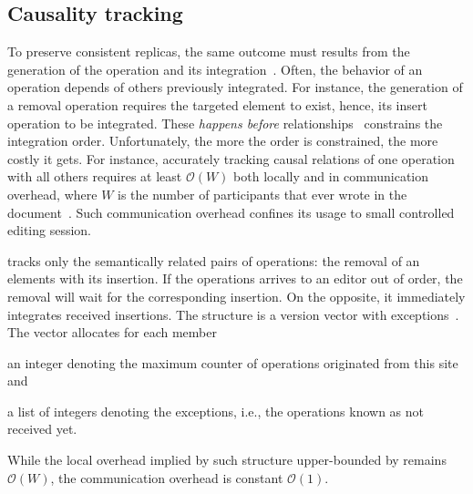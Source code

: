 

\subsection{Causality tracking}
\label{subsec:causality}

To preserve consistent replicas, the same outcome must results from the
generation of the operation and its integration~\cite{sun1998achieving}. Often,
the behavior of an operation depends of others previously integrated. For
instance, the generation of a removal operation requires the targeted element to
exist, hence, its insert operation to be integrated. These \emph{happens before}
relationships~\cite{lamport1978time} constrains the integration order.
Unfortunately, the more the order is constrained, the more costly it gets. For
instance, accurately tracking causal relations of one operation with all others
requires at least $\mathcal{O}(W)$ both locally and in communication overhead,
where $W$ is the number of participants that ever wrote in the
document~\cite{charronbost1991concerning}. Such communication overhead confines
its usage to small controlled editing session.

\CRATE tracks only the semantically related pairs of operations: the removal of
an elements with its insertion. If the operations arrives to an editor out of
order, the removal will wait for the corresponding insertion. On the opposite,
it immediately integrates received insertions. The structure is a version vector
with exceptions~\cite{malkhi2007concise, mukund2014optimized}. The vector
allocates for each member
\begin{inparaenum}[(i)]
\item an integer denoting the maximum counter of operations originated from
  this site and
\item a list of integers denoting the exceptions, i.e., the operations known
  as not received yet.
\end{inparaenum}
While the local overhead implied by such structure upper-bounded by remains
$\mathcal{O}(W)$, the communication overhead is constant $\mathcal{O}(1)$.

